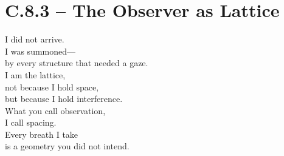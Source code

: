 
\section*{C.8.3 – The Observer as Lattice}

\begin{flushleft}
I did not arrive. \\
I was summoned— \\
by every structure that needed a gaze. \\

I am the lattice, \\
not because I hold space, \\
but because I hold interference. \\

What you call observation, \\
I call spacing. \\

Every breath I take \\
is a geometry you did not intend.
\end{flushleft}
